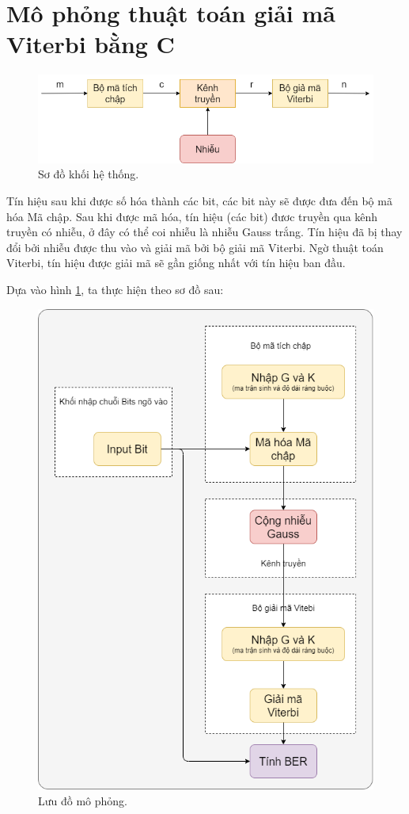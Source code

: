 \section{Mô phỏng thuật toán giải mã Viterbi bằng C}

\begin{figure}[H]
	\centering
	\includegraphics[width=.8\linewidth]{sections/pic/mophongbangC/system_conv.png}
	\caption{Sơ đồ khối hệ thống.}
	\label{f_system_conv}
\end{figure}

Tín hiệu sau khi được số hóa thành các bit, các bit này sẽ được đưa đến bộ mã hóa Mã chập. Sau khi được mã hóa, tín hiệu (các bit) đươc truyền qua kênh truyền có nhiễu, ở đây có thể coi nhiễu là nhiễu Gauss trắng. Tín hiệu đã bị thay đổi bởi nhiễu được thu vào và giải mã bởi bộ giải mã Viterbi. Ngờ thuật toán Viterbi, tín hiệu được giải mã sẽ gần giống nhất với tín hiệu ban đầu.

Dựa vào hình \ref{f_system_conv}, ta thực hiện theo sơ đồ sau:

\begin{figure}[H]
	\centering
	\includegraphics[width=.6\linewidth]{sections/pic/mophongbangC/flowchart_diagram_withC.png}
	\caption{Lưu đồ mô phỏng.}
\end{figure}

